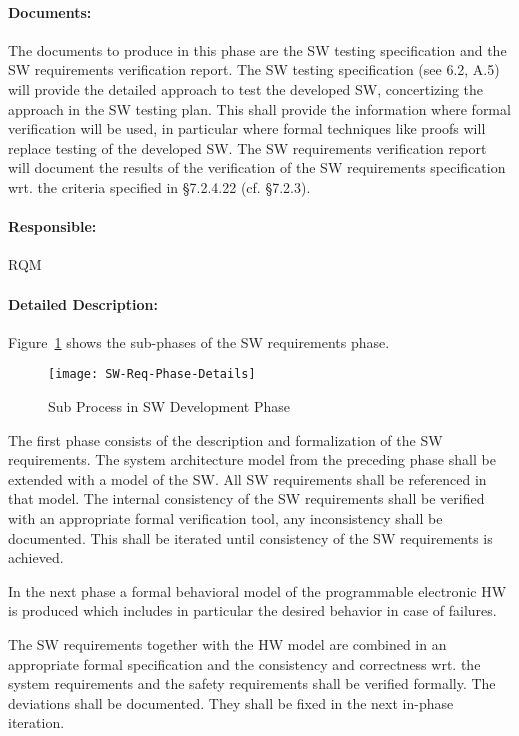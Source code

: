 \paragraph{Documents:}
\label{sec:sw-req-documents}
The documents to produce in this phase are the SW testing specification and the
SW requirements verification report. The SW testing specification (see 6.2, A.5)
will provide the detailed approach to test the developed SW, concertizing the
approach in the SW testing plan. This shall provide the information where formal
verification will be used, in particular where formal techniques like proofs
will replace testing of the developed SW.  The SW requirements verification
report will document the results of the verification of the SW requirements
specification wrt. the criteria specified in §7.2.4.22 (cf. §7.2.3).

\paragraph{Responsible:}
\label{sec:sw-req-responsible}
RQM

\paragraph{Detailed Description:}
\label{sec:sw-req-deta-descr}
Figure~\ref{fig:detailed-sw-dev-phase} shows the sub-phases of the SW
requirements phase.

\begin{figure}[ht]
  \centering
  \texttt{[image: SW-Req-Phase-Details]}
  \caption{Sub Process in SW Development Phase}
  \label{fig:detailed-sw-dev-phase}
\end{figure}

The first phase consists of the description and formalization of the SW
requirements. The system architecture model from the preceding phase shall be
extended with a model of the SW. All SW requirements shall be referenced in that
model. The internal consistency of the SW requirements shall be verified with an
appropriate formal verification tool, any inconsistency shall be
documented. This shall be iterated until consistency of the SW requirements is
achieved.

In the next phase a formal behavioral model of the programmable electronic HW is
produced which includes in particular the desired behavior in case of
failures.

The SW requirements together with the HW model are combined in an appropriate
formal specification  and the consistency and correctness wrt. the system
requirements and the safety requirements shall be verified formally. The
deviations shall be documented. They shall be fixed in the next in-phase
iteration.



